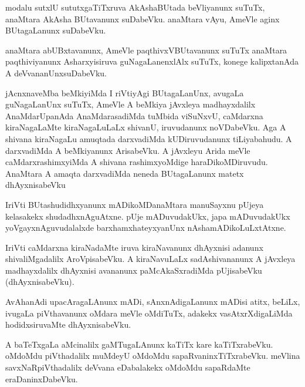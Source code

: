 \documentclass{article}
\begin{document}
\begin{mn}
modalu  sutxlU  sututxgaTiTxruva  AkAshaBUtada  beVliyanunx  suTuTx,  anaMtara  AkAsha BUtavanunx  suDabeVku.  
anaMtara  vAyu,  AmeVle  aginx BUtagaLanunx  suDabeVku.
\end{mn}

\begin{mn}
anaMtara  abUBxtavanunx,  AmeVle  paqthivxVBUtavanunx  suTuTx  anaMtara  paqthiviyanunx  Asharxyisiruva  
guNagaLanenxlAlx  suTuTx,  konege  kalipxtanAda  A  deVvananUnxsuDabeVku.
\end{mn}

\begin{mn}
jAcnxnaveMba  beMkiyiMda  I riVtiyAgi  BUtagaLanUnx,  avugaLa  guNagaLanUnx  suTuTx,  AmeVle  A  beMkiya  
jAvxleya  madhayxdalilx  AnaMdarUpanAda  AnaMdarasadiMda  tuMbida  viSuNxvU,  caMdarxna  kiraNagaLaMte  
kiraNagaLuLaLx  shivanU,  iruvudanunx  noVDabeVku.  Aga  A  shivana  kiraNagaLu  amuqtada  darxvadiMda  
kUDiruvudanunx  tiLiyabahudu.  A  darxvadiMda  A  beMkiyanunx  ArisabeVku.  A  jAvxleyu  Arida  meVle  
caMdarxrashimxyiMda  A  shivana  rashimxyoMdige  haraDikoMDiruvudu.  AnaMtara  A  amaqta  darxvadiMda  
neneda  BUtagaLanunx  matetx  dhAyxnisabeVku
\end{mn}

\begin{mn}
IriVti  BUtashudidhxyanunx  mADikoMDanaMtara  manuSayxnu  pUjeya  kelasakekx  shudadhxnAguAtxne.  pUje  
mADuvudakUkx,  japa  mADuvudakUkx  yoVgayxnAguvudalalxde  barxhamxhateyxyanUnx  nAshamADikoLuLxtAtxne.
\end{mn}

\begin{mn}
IriVti  caMdarxna  kiraNadaMte  iruva  kiraNavanunx  dhAyxnisi  adanunx  shivaliMgadalilx  AroVpisabeVku.  A  kiraNavuLaLx  
sadAshivananunx  A  jAvxleya madhayxdalilx  dhAyxnisi  avananunx  paMcAkaSxradiMda  pUjisabeVku (dhAyxnisabeVku).
\end{mn}

\begin{mn}
AvAhanAdi  upacAragaLAnunx  mADi,  sAnxnAdigaLanunx  mADisi  atitx,  beLiLx,  ivugaLa  piVthavanunx  
oMdara  meVle  oMdiTuTx,  adakekx  vasAtxrXdigaLiMda  hodidxsiruvaMte  dhAyxnisabeVku.
\end{mn}

\begin{mn}
A  baTeTxgaLa  aMcinalilx  gaMTugaLAnunx  kaTiTx  kare  kaTiTxrabeVku.  oMdoMdu  piVthadalilx  muMdeyU  oMdoMdu  
sapaRvaninxTiTxrabeVku.  meVlina  savxNaRpiVthadalilx  deVvana  eDabalakekx  oMdoMdu  sapaRdaMte  eraDaninxDabeVku.
\end{mn}
\end{document}
